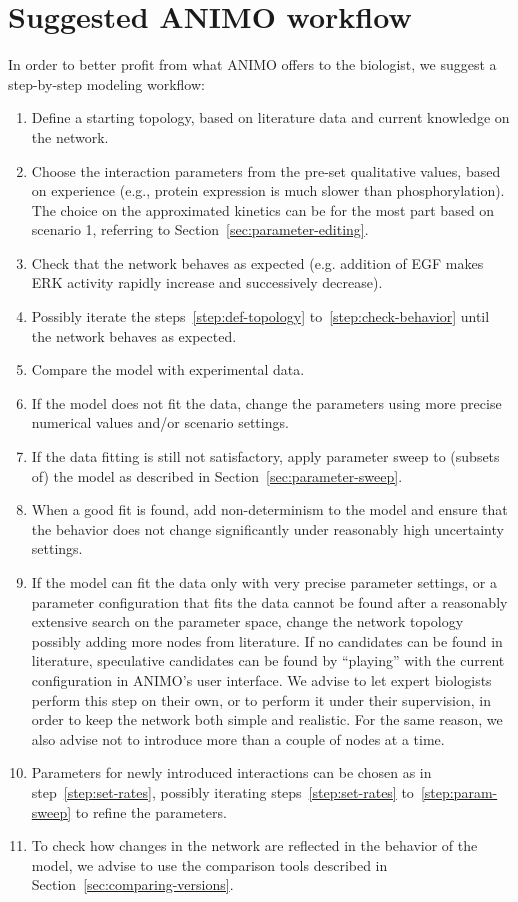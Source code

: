 \documentclass[submission,copyright,creativecommons]{eptcs}
\begin{document}
\section{Suggested ANIMO workflow}
In order to better profit from what ANIMO offers to the biologist, we suggest a step-by-step modeling workflow:
\begin{enumerate}
  \item\label{step:def-topology} Define a starting topology, based on literature data and current knowledge on the network.
  \item\label{step:set-rates} Choose the interaction parameters from the pre-set qualitative values,
    based on experience (e.g., protein expression is much slower than phosphorylation).
    The choice on the approximated kinetics can be for the most part based on scenario 1, referring to Section~\ref{sec:parameter-editing}.
  \item\label{step:check-behavior} Check that the network behaves as expected (e.g. addition of EGF makes ERK activity rapidly increase and successively decrease).
  \item Possibly iterate the steps~\ref{step:def-topology} to~\ref{step:check-behavior} until the network behaves as expected.
  \item Compare the model with experimental data.
  \item\label{step:precise-fit} If the model does not fit the data, change the parameters using more precise numerical values and/or scenario settings.
  \item\label{step:param-sweep} If the data fitting is still not satisfactory, apply parameter sweep to (subsets of) the model as described in Section~\ref{sec:parameter-sweep}.
  \item When a good fit is found, add non-determinism to the model and ensure that the
     behavior does not change significantly under reasonably high uncertainty settings.
  \item If the model can fit the data only with very precise parameter settings, or a
    parameter configuration that fits the data cannot be found after a reasonably extensive search
    on the parameter space, change the network topology possibly adding more nodes from literature.
    If no candidates can be found in literature, speculative candidates can be found by ``playing'' with the current
    configuration in ANIMO's user interface.
    We advise to let expert biologists perform this step on their own, or to perform it under their supervision,
    in order to keep the network both simple and realistic. For the same reason, we also advise not to introduce more than a couple of nodes at a time.
  \item Parameters for newly introduced interactions can be chosen as in step~\ref{step:set-rates}, possibly iterating
    steps~\ref{step:set-rates} to~\ref{step:param-sweep} to refine the parameters.
  \item To check how changes in the network are reflected in the behavior of the model, we advise to use the comparison tools
    described in Section~\ref{sec:comparing-versions}.
\end{enumerate}
\end{document}

